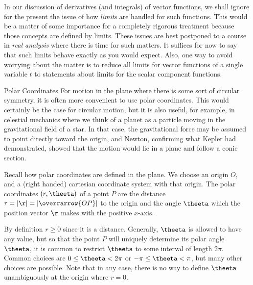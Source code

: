 
In our discussion of derivatives (and integrals) of vector
functions, we shall ignore for the present the issue of how {\it limits\/} are handled
for such functions.  This would be a matter of some importance
for a completely rigorous treatment because those concepts are 
defined by limits.  These issues are best postponed to a course in
{\it real analysis\/} where there is time for such matters.  It suffices
for now to say that such limits behave exactly as you would expect.
Also, one way to avoid worrying about the matter is to reduce all
limits for vector functions of a single variable $t$ to statements about
limits for the scalar component functions.
\endremark

\subhead Polar Coordinates \endsubhead
For motion in the plane where there is some sort of circular symmetry,
it is often more convenient to use polar coordinates.  This would
certainly be the case for circular motion, but it is also useful,
for example, in celestial mechanics where we think of a planet as
a particle moving in the gravitational field of a star.  In that
case, the gravitational force may be assumed to point directly toward
the origin, and Newton, confirming what Kepler had demonstrated, showed
that the motion would lie in a plane and follow a conic section.

Recall how polar coordinates are defined in the plane.  We choose
an origin $O$, and a (right handed) cartesian coordinate system with
that origin.  The polar coordinates $(r, \theeta)$
 of a point $P$ are the distance $r =|\r| = |\overrarrow{OP}|$ to
the origin and the angle $\theeta$ which the position vector $\r$
makes with the positive $x$-axis.
%
\medskip
\centerline{}
\medskip
By definition $r \ge 0$ since it is a distance.  Generally, $\theeta$
is allowed to have any value, but so that the point $P$ will
uniquely determine its polar angle $\theeta$, it is common to restrict
$\theeta$ to some interval of length $2\pi$.  Common choices are
$0\le \theeta < 2\pi$ or $-\pi \le \theeta < \pi$, but many other
choices are possible.  Note that in any case, there is no way to
define $\theeta$ unambiguously at the origin where $r = 0$.  

